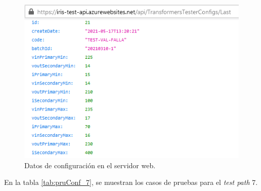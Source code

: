 \begin{figure}[htpb]
	\centering
	\includegraphics[scale=1]{./Figures/serv_web_falla_conf.png}
	\caption{Datos de configuración en el servidor web.}
	\label{fig:serv_web_conf}
\end{figure}

En la tabla \ref{tab:pruConf_7}, se muestran los casos de pruebas para el \textit{test path} 7.

